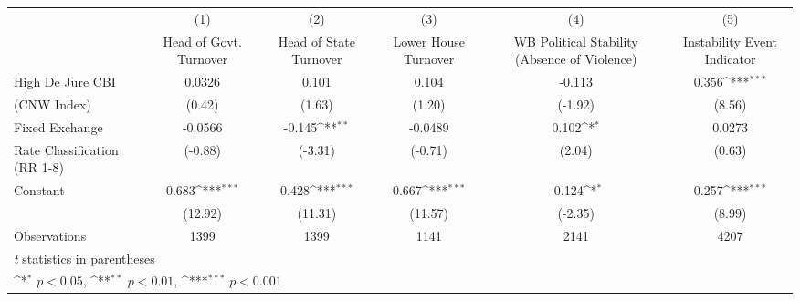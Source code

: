 {
\def\sym#1{\ifmmode^{#1}\else\(^{#1}\)\fi}
\begin{tabular}{l*{5}{c}}
\toprule
                &\multicolumn{1}{c}{(1)}&\multicolumn{1}{c}{(2)}&\multicolumn{1}{c}{(3)}&\multicolumn{1}{c}{(4)}&\multicolumn{1}{c}{(5)}\\
                &\multicolumn{1}{c}{Head of Govt. Turnover}&\multicolumn{1}{c}{Head of State Turnover}&\multicolumn{1}{c}{Lower House Turnover}&\multicolumn{1}{c}{WB Political Stability (Absence of Violence)}&\multicolumn{1}{c}{Instability Event Indicator}\\
\midrule
High De Jure CBI&   0.0326         &    0.101         &    0.104         &   -0.113         &    0.356\sym{***}\\
(CNW Index)     &   (0.42)         &   (1.63)         &   (1.20)         &  (-1.92)         &   (8.56)         \\
\addlinespace
Fixed Exchange  &  -0.0566         &   -0.145\sym{**} &  -0.0489         &    0.102\sym{*}  &   0.0273         \\
Rate Classification (RR 1-8)&  (-0.88)         &  (-3.31)         &  (-0.71)         &   (2.04)         &   (0.63)         \\
\addlinespace
Constant        &    0.683\sym{***}&    0.428\sym{***}&    0.667\sym{***}&   -0.124\sym{*}  &    0.257\sym{***}\\
                &  (12.92)         &  (11.31)         &  (11.57)         &  (-2.35)         &   (8.99)         \\
\midrule
Observations    &     1399         &     1399         &     1141         &     2141         &     4207         \\
\bottomrule
\multicolumn{6}{l}{\footnotesize \textit{t} statistics in parentheses}\\
\multicolumn{6}{l}{\footnotesize \sym{*} \(p<0.05\), \sym{**} \(p<0.01\), \sym{***} \(p<0.001\)}\\
\end{tabular}
}
